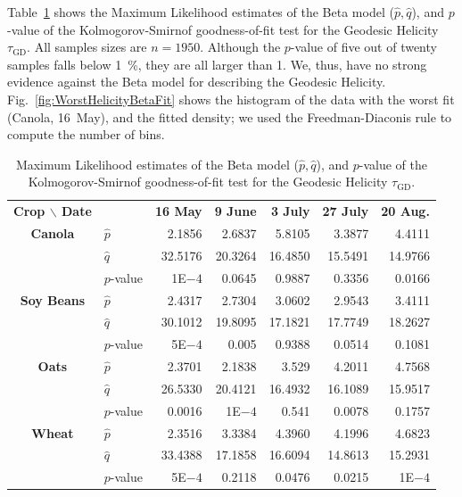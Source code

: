 \documentclass[journal]{IEEEtran}
\begin{document}
	Table~\ref{tab:params_helicity} shows the Maximum Likelihood estimates of the Beta model ($\widehat p,\widehat q$), and $p$-value of the Kolmogorov-Smirnof goodness-of-fit test for the Geodesic Helicity $\tau_{\text{GD}}$.
	All samples sizes are $n=1950$.
	Although the $p$-value of five out of twenty samples falls below \SI{1}{\percent}, they are all larger than \SI{1}{\pertenmille}.
	We, thus, have no strong evidence against the Beta model for describing the Geodesic Helicity.
	Fig.~\ref{fig:WorstHelicityBetaFit} shows the histogram of the data with the worst fit (Canola, 16~May), and the fitted density; we used the Freedman-Diaconis rule to compute the number of bins.
	
	\begin{table}[hbt]
		\centering
		\caption{Maximum Likelihood estimates of the Beta model ($\widehat p,\widehat q$), and $p$-value of the Kolmogorov-Smirnof goodness-of-fit test for the Geodesic Helicity $\tau_{\text{GD}}$.}
		\label{tab:params_helicity}
		\setlength{\tabcolsep}{3.8pt}
		\begin{tabular}{clrrrrr}
			\toprule
			\textbf{Crop $\backslash$ Date} & & \textbf{16 May} & \textbf{9 June} & \textbf{3 July} & \textbf{27 July} & \textbf{20 Aug.}\\ \cmidrule(lr){1-2} \cmidrule(lr){3-3} \cmidrule(lr){4-4} \cmidrule(lr){5-5} \cmidrule(lr){6-6} \cmidrule(lr){7-7}
			\textbf{Canola} 	
			& $\widehat{p}$ & 2.1856  	& 2.6837    & 5.8105 	& 3.3877  	& 4.4111 \\
			& $\widehat{q}$ & 32.5176 	& 20.3264 	& 16.4850 	& 15.5491 	& 14.9766\\ 
			& $p$-value 	& 1E$-4$ 		& 0.0645 	& 0.9887 	& 0.3356 	& 0.0166\\		
			\midrule
			\textbf{Soy Beans}
			& $\widehat{p}$ & 2.4317   	& 2.7304   	& 3.0602   	& 2.9543   	& 3.4111 \\
			& $\widehat{q}$ & 30.1012   & 19.8095   & 17.1821   & 17.7749   & 18.2627 \\ 
			& $p$-value 	& 5E$-4$ 	& 0.005 	& 0.9388 	& 0.0514 	& 0.1081\\			
			\midrule
			\textbf{Oats}
			& $\widehat{p}$ & 2.3701   	& 2.1838  	& 3.529     & 4.2011 	& 4.7568 \\
			& $\widehat{q}$ & 26.5330 	& 20.4121   & 16.4932 	& 16.1089  	& 15.9517 \\ 
			& $p$-value 	& 0.0016 	& 1E$-4$ 	& 0.541 	& 0.0078	& 0.1757 \\
			\midrule
			\textbf{Wheat} 
			& $\widehat{p}$ & 2.3516   	& 3.3384  	& 4.3960  	& 4.1996  	& 4.6823   \\
			& $\widehat{q}$ & 33.4388   & 17.1858   & 16.6094   & 14.8613   & 15.2931   \\
			& $p$-value 	& 5E$-4$ 	& 0.2118 	& 0.0476 	& 0.0215 	& 1E$-4$\\	
			\bottomrule
		\end{tabular}
	\end{table}
	
\end{document}
